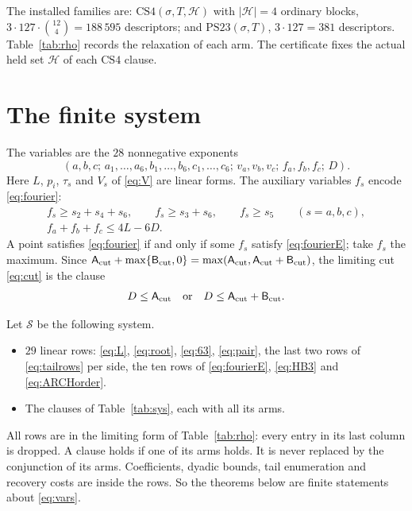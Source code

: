 \documentclass{amsart}
\theoremstyle{definition}
\theoremstyle{plain}
\numberwithin{equation}{section}
\numberwithin{table}{section}
\newcommand{\pos}[1]{\max\{#1,0\}}
\begin{document}
The installed families are: $\mathrm{CS4}(\sigma,T,\mathcal H)$ with
$|\mathcal H|=4$ ordinary blocks, $3\cdot127\cdot\binom{12}4=188\,595$
descriptors; and $\mathrm{PS23}(\sigma,T)$, $3\cdot127=381$ descriptors. Table~\ref{tab:rho}
records the relaxation of each arm. The certificate fixes the actual held
set $\mathcal H$ of each $\mathrm{CS4}$ clause.

\section{The finite system}\label{sec:cert}

The variables are the $28$ nonnegative exponents
\begin{equation}\label{eq:vars}
 (a,b,c;\,a_1,\dots,a_6,b_1,\dots,b_6,c_1,\dots,c_6;\,v_a,v_b,v_c;\,
 f_a,f_b,f_c;\,D).
\end{equation}
Here $L$, $p_i$, $\tau_s$ and $V_s$ of \eqref{eq:V} are linear forms. The
auxiliary variables $f_s$ encode \eqref{eq:fourier}:
\begin{equation}\label{eq:fourierE}
 \begin{gathered}
 f_s\ge s_2+s_4+s_6,\qquad f_s\ge s_3+s_6,\qquad f_s\ge s_5\qquad(s=a,b,c),\\
 f_a+f_b+f_c\le4L-6D .
 \end{gathered}
\end{equation}
A point satisfies \eqref{eq:fourier} if and only if some $f_s$ satisfy
\eqref{eq:fourierE}; take $f_s$ the maximum. Since
$\mathsf A_{\rm cut}+\pos{\mathsf B_{\rm cut}}
=\max(\mathsf A_{\rm cut},\mathsf A_{\rm cut}+\mathsf B_{\rm cut})$, the
limiting cut \eqref{eq:cut} is the clause
\begin{equation}\label{eq:cutor}
 D\le\mathsf A_{\rm cut}\quad\text{or}\quad
 D\le\mathsf A_{\rm cut}+\mathsf B_{\rm cut} .
\end{equation}

Let $\mathcal S$ be the following system.
\begin{itemize}
\item $29$ linear rows: \eqref{eq:L}, \eqref{eq:root}, \eqref{eq:63},
 \eqref{eq:pair}, the last two rows of \eqref{eq:tailrows} per side, the ten
 rows of \eqref{eq:fourierE}, \eqref{eq:HB3} and \eqref{eq:ARCHorder}.
\item The clauses of Table~\ref{tab:sys}, each with all its arms.
\end{itemize}
All rows are in the limiting form of Table~\ref{tab:rho}: every entry in its
last column is dropped. A clause holds if one of
its arms holds. It is never replaced by the conjunction of its arms.
Coefficients, dyadic bounds, tail enumeration and recovery costs are inside
the rows. So the theorems below are finite statements about \eqref{eq:vars}.
\end{document}
